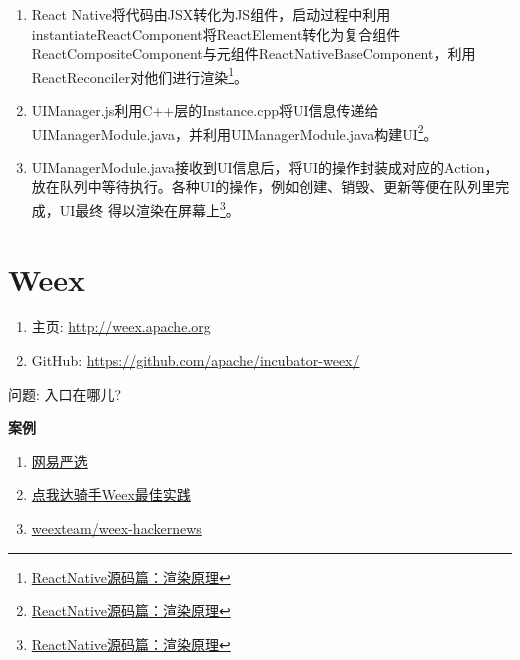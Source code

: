 \begin{enumerate}
\def\labelenumi{\arabic{enumi}.}
\tightlist
\item
  React
  Native将代码由JSX转化为JS组件，启动过程中利用instantiateReactComponent将ReactElement转化为复合组件ReactCompositeComponent与元组件ReactNativeBaseComponent，利用
  ReactReconciler对他们进行渲染\footnote{\href{https://github.com/guoxiaoxing/react-native/blob/master/doc/ReactNative\%E6\%BA\%90\%E7\%A0\%81\%E7\%AF\%87/4ReactNative\%E6\%BA\%90\%E7\%A0\%81\%E7\%AF\%87\%EF\%BC\%9A\%E6\%B8\%B2\%E6\%9F\%93\%E5\%8E\%9F\%E7\%90\%86.md}{ReactNative源码篇：渲染原理}}。
\item
  UIManager.js利用C++层的Instance.cpp将UI信息传递给UIManagerModule.java，并利用UIManagerModule.java构建UI\footnote{\href{https://github.com/guoxiaoxing/react-native/blob/master/doc/ReactNative\%E6\%BA\%90\%E7\%A0\%81\%E7\%AF\%87/4ReactNative\%E6\%BA\%90\%E7\%A0\%81\%E7\%AF\%87\%EF\%BC\%9A\%E6\%B8\%B2\%E6\%9F\%93\%E5\%8E\%9F\%E7\%90\%86.md}{ReactNative源码篇：渲染原理}}。
\item
  UIManagerModule.java接收到UI信息后，将UI的操作封装成对应的Action，放在队列中等待执行。各种UI的操作，例如创建、销毁、更新等便在队列里完成，UI最终
  得以渲染在屏幕上\footnote{\href{https://github.com/guoxiaoxing/react-native/blob/master/doc/ReactNative\%E6\%BA\%90\%E7\%A0\%81\%E7\%AF\%87/4ReactNative\%E6\%BA\%90\%E7\%A0\%81\%E7\%AF\%87\%EF\%BC\%9A\%E6\%B8\%B2\%E6\%9F\%93\%E5\%8E\%9F\%E7\%90\%86.md}{ReactNative源码篇：渲染原理}}。
\end{enumerate}

\section{Weex}\label{weex}

\begin{enumerate}
\def\labelenumi{\arabic{enumi}.}
\tightlist
\item
  主页: \url{http://weex.apache.org}
\item
  GitHub: \url{https://github.com/apache/incubator-weex/}
\end{enumerate}

问题: 入口在哪儿?

\textbf{案例}

\begin{enumerate}
\def\labelenumi{\arabic{enumi}.}
\tightlist
\item
  \href{https://github.com/zwwill/yanxuan-weex-demo}{网易严选}
\item
  \href{https://mp.weixin.qq.com/s/dowOE_QpZrtV5GH9EAgyHg}{点我达骑手Weex最佳实践}
\item
  \href{https://github.com/weexteam/weex-hackernews}{weexteam/weex-hackernews}
\end{enumerate}

